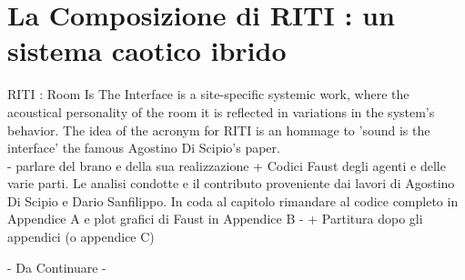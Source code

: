 \section{La Composizione di RITI : un sistema caotico ibrido}
\label{sec:La Composizione di RITI : un sistema caotico ibrido}

RITI : Room Is The Interface is a site-specific systemic work, 
where the acoustical personality of the room it is reflected in variations in the system's behavior. 
The idea of the acronym for RITI is an hommage to 'sound is the interface' the famous Agostino Di Scipio's paper. \\

- parlare del brano e della sua realizzazione +
Codici Faust degli agenti e delle varie parti.
Le analisi condotte e il contributo proveniente dai lavori
di Agostino Di Scipio e Dario Sanfilippo.
In coda al capitolo rimandare al codice completo in Appendice A e plot
grafici di Faust in Appendice B -
+ Partitura dopo gli appendici (o appendice C)

\begin{center} \vspace{0.5cm} \Huge - Da Continuare - \normalsize \vspace{0.5cm} \end{center}
